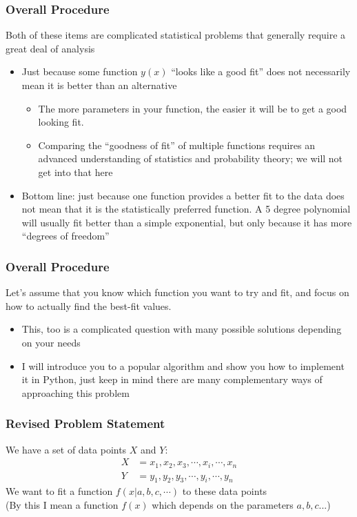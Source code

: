 \documentclass{beamer}
\begin{document}
	\begin{frame}
		\frametitle{Overall Procedure}
		Both of these items are complicated statistical problems that generally require a great deal of analysis
		\begin{itemize}
			\item Just because some function $y(x)$ ``looks like a good fit'' does not necessarily mean it is better than an alternative
			\begin{itemize}
				\item The more parameters in your function, the easier it will be to get a good looking fit.
				\item Comparing the ``goodness of fit'' of multiple functions requires an advanced understanding of statistics and probability theory; we will not get into that here
			\end{itemize}
		\item <2-> Bottom line: just because one function provides a better fit to the data does not mean that it is the statistically preferred function. A 5 degree polynomial will usually fit better than a simple exponential, but only because it has more ``degrees of freedom''
		\end{itemize}
	\end{frame}

	\begin{frame}
		\frametitle{Overall Procedure}
		Let's assume that you know which function you want to try and fit, and focus on how to actually find the best-fit values.
		\begin{itemize}
			\item <2-> This, too is a complicated question with many possible solutions depending on your needs
			\item <3-> I will introduce you to a popular algorithm and show you how to implement it in Python, just keep in mind there are many complementary ways of approaching this problem
		\end{itemize}
	\end{frame}

	\begin{frame}
		\frametitle{Revised Problem Statement}
		We have a set of data points $X$ and $Y$:
		\begin{align*}
			X &= x_1, x_2, x_3, \cdots, x_i, \cdots, x_n\\
			Y &= y_1, y_2, y_3, \cdots, y_i, \cdots, y_n
		\end{align*}
		We want to fit a function $f(x|{a, b, c, \cdots})$ to these data points\\
		
		(By this I mean a function $f(x)$ which depends on the parameters $a,b,c...$)
	\end{frame}
\end{document}
